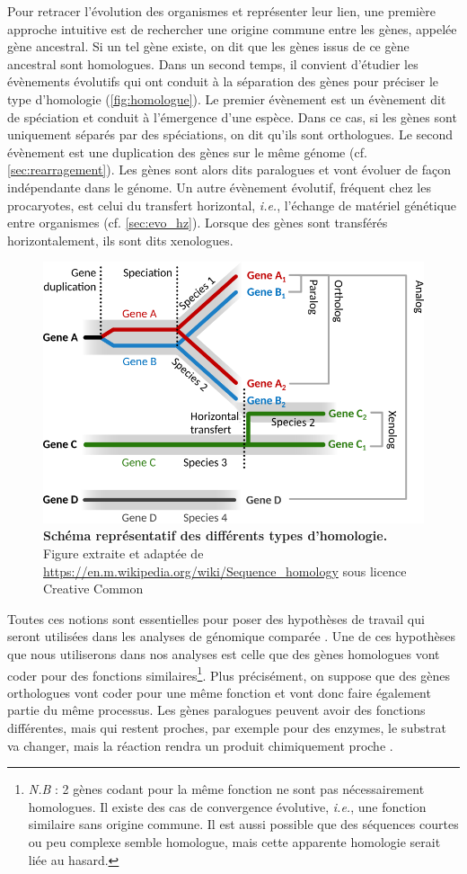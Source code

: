 Pour retracer l'évolution des organismes et représenter leur lien, une première approche intuitive est de rechercher une origine commune entre les gènes, appelée gène ancestral. Si un tel gène existe, on dit que les gènes issus de ce gène ancestral sont homologues. Dans un second temps, il convient d'étudier les évènements évolutifs qui ont conduit à la séparation des gènes pour préciser le type d'homologie (\autoref{fig:homologue}). 
Le premier évènement est un évènement dit de spéciation et conduit à l'émergence d'une espèce. Dans ce cas, si les gènes sont uniquement séparés par des spéciations, on dit qu'ils sont orthologues. Le second évènement est une duplication des gènes sur le même génome (cf. \autoref{sec:rearragement}). Les gènes sont alors dits paralogues et vont évoluer de façon indépendante dans le génome. Un autre évènement évolutif, fréquent chez les procaryotes, est celui du transfert horizontal, \textit{i.e.}, l'échange de matériel génétique entre organismes (cf. \autoref{sec:evo_hz}). Lorsque des gènes sont transférés horizontalement, ils sont dits xenologues.

\begin{figure}[htbp]
    \centering
    \includegraphics[width=.8\textwidth]{images/homologs.png}
    \caption[Schéma représentatif des différents types d'homologie]{\textbf{Schéma représentatif des différents types d'homologie.} Figure extraite et adaptée de \url{https://en.m.wikipedia.org/wiki/Sequence_homology} sous licence Creative Common}
    \label{fig:homologue}
\end{figure}

\newpage
Toutes ces notions sont essentielles pour poser des hypothèses de travail qui seront utilisées dans les analyses de génomique comparée \cite{koonin_orthologs_2005,stamboulian_ortholog_2020}. Une de ces hypothèses que nous utiliserons dans nos analyses est celle que des gènes homologues vont coder pour des fonctions similaires\footnote{\textit{N.B} : 2 gènes codant pour la même fonction ne sont pas nécessairement homologues. Il existe des cas de convergence évolutive, \textit{i.e.}, une fonction similaire sans origine commune. Il est aussi possible que des séquences courtes ou peu complexe semble homologue, mais cette apparente homologie serait liée au hasard.}. Plus précisément, on suppose que des gènes orthologues vont coder pour une même fonction et vont donc faire également partie du même processus. Les gènes paralogues peuvent avoir des fonctions différentes, mais qui restent proches, par exemple pour des enzymes, le substrat va changer, mais la réaction rendra un produit chimiquement proche \cite{mirny_using_2002}.